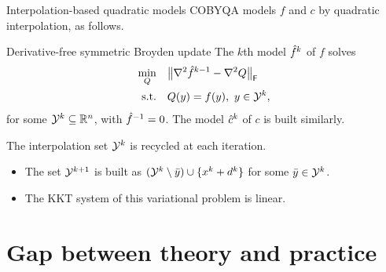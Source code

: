 \documentclass[
]{presentation}
\newcommand{\obj}{f}
\newcommand{\objm}[1][]{\hat{f}\ifblank{#1}{}{^{#1}}}
\newcommand{\con}{c}
\newcommand{\conm}[1][]{\hat{c}\ifblank{#1}{}{^{#1}}}
\newcommand{\iter}[1][]{x\ifblank{#1}{}{^{#1}}}
\newcommand{\step}[1][]{d\ifblank{#1}{}{^{#1}}}
\newcommand{\xpt}[1][]{\mathcal{Y}\ifblank{#1}{}{^{#1}}}
\begin{document}
\begin{frame}{Interpolation-based quadratic models}
    COBYQA models $\obj$ and $\con$ by \alert{quadratic} interpolation, as follows.

    \medskip

    \begin{block}{Derivative-free symmetric Broyden update \parencite{Powell_2004b}}
        The $k$th model $\objm[k]$ of $\obj$ solves
        \begin{align*}
            \min_Q          & \quad \norm[\big]{\nabla^2 \objm[k - 1] - \nabla^2 Q}_{\mathsf{F}}\\
            \textrm{s.t.}   & \quad Q(y) = \obj(y), ~ y \in \xpt[k],
        \end{align*}
        for some $\xpt[k] \subseteq \R^n$, with $\objm[-1] = 0$.
        The model $\conm[k]$ of $\con$ is built similarly.
    \end{block}

    \medskip

    The interpolation set $\xpt[k]$ is \alert{recycled} at each iteration.
    \begin{itemize}
        \item The set $\xpt[k + 1]$ is built as $(\xpt[k] \setminus {\bar{y}}) \cup \set{\iter[k] + \step[k]}$ for some $\bar{y} \in \xpt[k]$.
        \item The KKT system of this variational problem is \alert{linear}.
    \end{itemize}
\end{frame}

\section{Gap between theory and practice}
\end{document}
